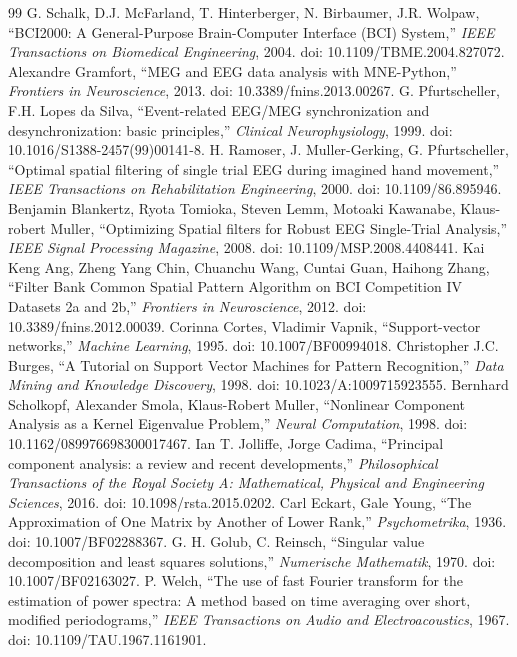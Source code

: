 \begin{thebibliography}{99}
 G. Schalk, D.J. McFarland, T. Hinterberger, N. Birbaumer, J.R. Wolpaw, ``BCI2000: A General-Purpose Brain-Computer Interface (BCI) System,'' \emph{IEEE Transactions on Biomedical Engineering}, 2004. doi: 10.1109/TBME.2004.827072.
 Alexandre Gramfort, ``MEG and EEG data analysis with MNE-Python,'' \emph{Frontiers in Neuroscience}, 2013. doi: 10.3389/fnins.2013.00267.
 G. Pfurtscheller, F.H. Lopes da Silva, ``Event-related EEG/MEG synchronization and desynchronization: basic principles,'' \emph{Clinical Neurophysiology}, 1999. doi: 10.1016/S1388-2457(99)00141-8.
 H. Ramoser, J. Muller-Gerking, G. Pfurtscheller, ``Optimal spatial filtering of single trial EEG during imagined hand movement,'' \emph{IEEE Transactions on Rehabilitation Engineering}, 2000. doi: 10.1109/86.895946.
 Benjamin Blankertz, Ryota Tomioka, Steven Lemm, Motoaki Kawanabe, Klaus-robert Muller, ``Optimizing Spatial filters for Robust EEG Single-Trial Analysis,'' \emph{IEEE Signal Processing Magazine}, 2008. doi: 10.1109/MSP.2008.4408441.
 Kai Keng Ang, Zheng Yang Chin, Chuanchu Wang, Cuntai Guan, Haihong Zhang, ``Filter Bank Common Spatial Pattern Algorithm on BCI Competition IV Datasets 2a and 2b,'' \emph{Frontiers in Neuroscience}, 2012. doi: 10.3389/fnins.2012.00039.
 Corinna Cortes, Vladimir Vapnik, ``Support-vector networks,'' \emph{Machine Learning}, 1995. doi: 10.1007/BF00994018.
 Christopher J.C. Burges, ``A Tutorial on Support Vector Machines for Pattern Recognition,'' \emph{Data Mining and Knowledge Discovery}, 1998. doi: 10.1023/A:1009715923555.
 Bernhard Scholkopf, Alexander Smola, Klaus-Robert Muller, ``Nonlinear Component Analysis as a Kernel Eigenvalue Problem,'' \emph{Neural Computation}, 1998. doi: 10.1162/089976698300017467.
 Ian T. Jolliffe, Jorge Cadima, ``Principal component analysis: a review and recent developments,'' \emph{Philosophical Transactions of the Royal Society A: Mathematical, Physical and Engineering Sciences}, 2016. doi: 10.1098/rsta.2015.0202.
 Carl Eckart, Gale Young, ``The Approximation of One Matrix by Another of Lower Rank,'' \emph{Psychometrika}, 1936. doi: 10.1007/BF02288367.
 G. H. Golub, C. Reinsch, ``Singular value decomposition and least squares solutions,'' \emph{Numerische Mathematik}, 1970. doi: 10.1007/BF02163027.
 P. Welch, ``The use of fast Fourier transform for the estimation of power spectra: A method based on time averaging over short, modified periodograms,'' \emph{IEEE Transactions on Audio and Electroacoustics}, 1967. doi: 10.1109/TAU.1967.1161901.

\end{thebibliography}

